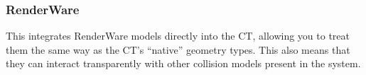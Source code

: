\documentclass[11pt]{article}
\begin{document}


\subsubsection{  RenderWare }

This integrates RenderWare models directly
into the CT, allowing you to treat them the same way as the CT's ``native''
geometry types. This also means that they can
interact transparently with other collision
models present in the system.

\end{document}
